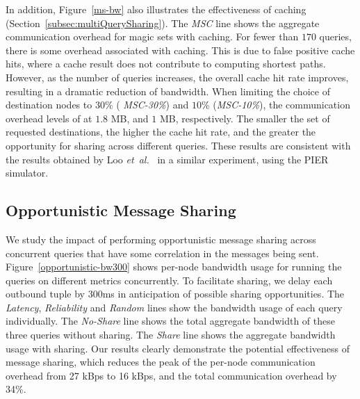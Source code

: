 
In addition, Figure~\ref{ms-bw} also illustrates the effectiveness of
caching (Section~\ref{subsec:multiQuerySharing}). The {\em MSC} line
shows the aggregate communication overhead for magic sets with caching. For
fewer than $170$ queries, there is some overhead associated with
caching. This is due to false positive cache hits, where a cache
result does not contribute to computing shortest paths. However, as
the number of queries increases, the overall cache hit rate improves,
resulting in a dramatic reduction of bandwidth. 
When limiting the choice of destination nodes to $30$\% ({\em
MSC-30\%}) and $10$\% ({\em MSC-10\%}), the communication overhead
levels of at $1.8$ MB, and $1$ MB, respectively. The smaller the set
of requested destinations, the higher the cache hit rate, and
the greater the opportunity for sharing across different queries.
These results are consistent with the results obtained by Loo
\textit{et~al.}~\cite{declareRoute} in a similar experiment,
using the PIER~\cite{pierCidr} simulator.


\subsection{Opportunistic Message Sharing}
\label{subsec:expr:correlated}

We study the impact of performing opportunistic message sharing across
concurrent queries that have some correlation in the messages being
sent. Figure~\ref{opportunistic-bw300} shows per-node bandwidth
usage for running the queries on different metrics
concurrently. To facilitate sharing, we delay each outbound tuple by
$300$ms in anticipation of possible sharing opportunities. The {\em
Latency}, {\em Reliability} and {\em Random} lines show the bandwidth
usage of each query individually. The {\em No-Share} line shows
the total aggregate bandwidth of these three queries without
sharing. The {\em Share} line shows the aggregate bandwidth
usage with sharing. Our results clearly demonstrate the
potential effectiveness of message sharing, which reduces the peak of
the per-node communication overhead from 27 kBps to 16 kBps, and the
total communication overhead by 34\%.


